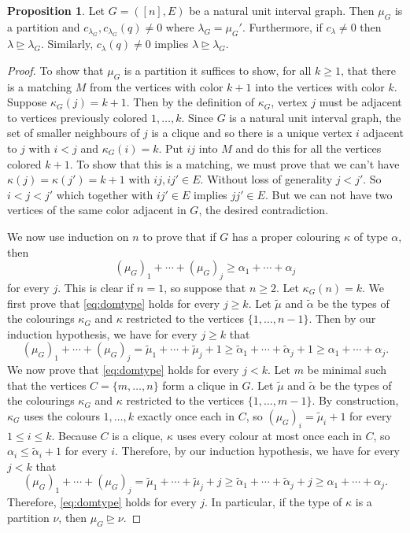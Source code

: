 \documentclass[12pt]{amsart}  %
\theoremstyle{definition}
\newtheorem{proposition}[theorem]{Proposition}
\theoremstyle{remark}
\numberwithin{equation}{section}
\newcommand{\ka}{\kappa}
\newcommand{\la}{\lambda}
\newcommand{\dom}{\unrhd}
\begin{document}
\begin{proposition}\label{prop:domsmallest}
Let $G=([n],E)$ be a natural unit interval graph. 
Then $\mu_G$ is a partition and $c_{\la_G},c_{\la_G}(q)\neq0$ where $\la_G=\mu_G'$.
Furthermore, if $c_\la\neq0$ then $\la\dom\la_G$.
Similarly, $c_\la(q)\neq0$ implies $\la\dom\la_G$.
\end{proposition}
\begin{proof}
To show that  $\mu_G$ is a partition it suffices to show, for all $k\ge 1$, that there is a matching $M$ from the vertices with color $k+1$ into the vertices with color $k$.  Suppose $\ka_G(j)=k+1$.  Then by the definition of $\ka_G$, vertex $j$ must be adjacent to vertices previously colored $1,\ldots,k$.  Since $G$ is a natural unit interval graph, the set of smaller neighbours of $j$ is a clique and so there is a unique vertex $i$ adjacent to $j$ with $i<j$ and $\ka_G(i)=k$.  Put $ij$ into  $M$ and do this for all the vertices colored $k+1$.  To show that this is a matching, we must prove that we can't have $\ka(j)=\ka(j')=k+1$ with $ij,ij'\in E$.  Without loss of generality $j<j'$.
So $i<j<j'$ which together with $ij'\in E$ implies $jj'\in E$.  But we can not have two vertices of the same color adjacent in $G$, the desired contradiction.

We now use induction on $n$ to prove that if $G$ has a proper colouring $\kappa$ of type $\alpha$, then
\begin{equation}\label{eq:domtype}(\mu_G)_1+\cdots+(\mu_G)_j\geq\alpha_1+\cdots+\alpha_j\end{equation}
for every $j$. This is clear if $n=1$, so suppose that $n\geq 2$. Let $\kappa_G(n)=k$. We first prove that \eqref{eq:domtype} holds for every $j\geq k$. Let $\tilde\mu$ and $\tilde\alpha$ be the types of the colourings $\kappa_G$ and $\kappa$ restricted to the vertices $\{1,\ldots,n-1\}$. Then by our induction hypothesis, we have for every $j\geq k$ that
$$(\mu_G)_1+\cdots+(\mu_G)_j=\tilde\mu_1+\cdots+\tilde\mu_j+1\geq \tilde\alpha_1+\cdots+\tilde\alpha_j+1\geq\alpha_1+\cdots+\alpha_j.$$
We now prove that \eqref{eq:domtype} holds for every $j<k$. Let $m$ be minimal such that the vertices $C=\{m,\ldots,n\}$ form a clique in $G$. Let $\tilde\mu$ and $\tilde\alpha$ be the types of the colourings $\kappa_G$ and $\kappa$ restricted to the vertices $\{1,\ldots,m-1\}$. By construction, $\kappa_G$ uses the colours $1,\ldots,k$ exactly once each in $C$, 
so $(\mu_G)_i=\tilde\mu_i+1$ for every $1\leq i\leq k$. Because $C$ is a clique, $\kappa$ uses every colour at most once each in $C$, so $\alpha_i\leq\tilde\alpha_i+1$ for every $i$. Therefore, by our induction hypothesis, we have for every $j<k$ that
$$(\mu_G)_1+\cdots+(\mu_G)_j=\tilde\mu_1+\cdots+\tilde\mu_j+j\geq \tilde\alpha_1+\cdots+\tilde\alpha_j+j\geq\alpha_1+\cdots+\alpha_j.$$
Therefore, \eqref{eq:domtype} holds for every $j$. In particular, if the type of $\kappa$ is a partition $\nu$, then 
$\mu_G\unrhd\nu$.


\end{proof}
\end{document}
